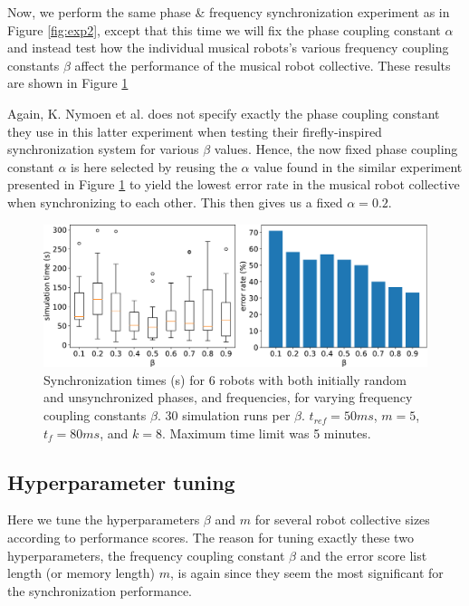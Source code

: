 		Now, we perform the same phase \& frequency synchronization experiment as in Figure \ref{fig:exp2}, except that this time we will fix the phase coupling constant $\alpha$ and instead test how the individual musical robots's various frequency coupling constants $\beta$ affect the performance of the musical robot collective. These results are shown in Figure \ref{fig:exp3}
		
		Again, K. Nymoen et al. does not specify exactly the phase coupling constant they use in this latter experiment when testing their firefly-inspired synchronization system for various $\beta$ values. Hence, the now fixed phase coupling constant $\alpha$ is here selected by reusing the $\alpha$ value found in the similar experiment presented in Figure \ref{fig:exp3} to yield the lowest error rate in the musical robot collective when synchronizing to each other. This then gives us a fixed $\alpha = 0.2$.
		
		\begin{figure}[ht!]
			\centering
			\includegraphics[width=\linewidth]{Assets/DocSegments/Chapters/ExperimentsAndResults/Figures/PerfScores/experiment3_perfScores.pdf}
			\caption{Synchronization times (s) for 6 robots with both initially random and unsynchronized phases, and frequencies, for varying frequency coupling constants $\beta$. 30 simulation runs per $\beta$. $t_{ref}=50ms$, $m=5$, $t_f=80ms$, and $k=8$. Maximum time limit was 5 minutes.}
			\label{fig:exp3}
		\end{figure}
		
		
	\subsection{Hyperparameter tuning}
	
	Here we tune the hyperparameters $\beta$ and $m$ for several robot collective sizes according to performance scores. The reason for tuning exactly these two hyperparameters, the frequency coupling constant $\beta$ and the error score list length (or memory length) $m$, is again since they seem the most significant for the synchronization performance.
	
